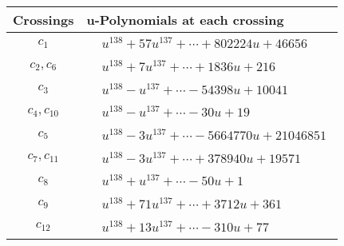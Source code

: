 \documentclass[1p]{elsarticle_modified}
\theoremstyle{definition}
\begin{document}
\begin{tabular}{m{50pt}|m{274pt}}
Crossings & \hspace{64pt}u-Polynomials at each crossing \\
\hline $$\begin{aligned}c_{1}\end{aligned}$$&$\begin{aligned}
&u^{138}+57 u^{137}+\cdots+802224 u+46656
\end{aligned}$\\
\hline $$\begin{aligned}c_{2},c_{6}\end{aligned}$$&$\begin{aligned}
&u^{138}+7 u^{137}+\cdots+1836 u+216
\end{aligned}$\\
\hline $$\begin{aligned}c_{3}\end{aligned}$$&$\begin{aligned}
&u^{138}- u^{137}+\cdots-54398 u+10041
\end{aligned}$\\
\hline $$\begin{aligned}c_{4},c_{10}\end{aligned}$$&$\begin{aligned}
&u^{138}- u^{137}+\cdots-30 u+19
\end{aligned}$\\
\hline $$\begin{aligned}c_{5}\end{aligned}$$&$\begin{aligned}
&u^{138}-3 u^{137}+\cdots-5664770 u+21046851
\end{aligned}$\\
\hline $$\begin{aligned}c_{7},c_{11}\end{aligned}$$&$\begin{aligned}
&u^{138}-3 u^{137}+\cdots+378940 u+19571
\end{aligned}$\\
\hline $$\begin{aligned}c_{8}\end{aligned}$$&$\begin{aligned}
&u^{138}+u^{137}+\cdots-50 u+1
\end{aligned}$\\
\hline $$\begin{aligned}c_{9}\end{aligned}$$&$\begin{aligned}
&u^{138}+71 u^{137}+\cdots+3712 u+361
\end{aligned}$\\
\hline $$\begin{aligned}c_{12}\end{aligned}$$&$\begin{aligned}
&u^{138}+13 u^{137}+\cdots-310 u+77
\end{aligned}$\\
\hline
\end{tabular}\\~\\
\end{document}
